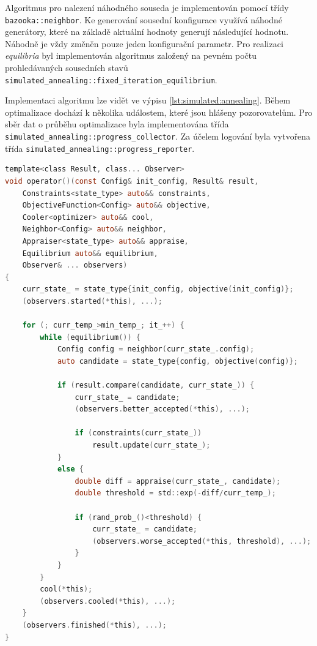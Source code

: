 Algoritmus pro nalezení náhodného souseda je implementován pomocí třídy \texttt{bazooka::neighbor}.
Ke generování sousední konfigurace využívá náhodné generátory, které na základě aktuální hodnoty generují následující hodnotu.
Náhodně je vždy změněn pouze jeden konfigurační parametr.
Pro realizaci \textit{equilibria} byl implementován algoritmus založený na pevném počtu prohledávaných sousedních stavů \texttt{simulated\_annealing::fixed\_iteration\_equilibrium}.

Implementaci algoritmu lze vidět ve výpisu \ref{lst:simulated:annealing}.
Během optimalizace dochází k několika událostem, které jsou hlášeny pozorovatelům.
Pro sběr dat o průběhu optimalizace byla implementována třída \texttt{simulated\_annealing::progress\_collector}.
Za účelem logování byla vytvořena třída \texttt{simulated\_annealing::progress\_reporter}.

\begin{lstlisting}[caption={~Implementace simulovaného ochlazování},label={lst:simulated:annealing},captionpos=t,abovecaptionskip=-\medskipamount,belowcaptionskip=\medskipamount,language=C]
template<class Result, class... Observer>
void operator()(const Config& init_config, Result& result,
    Constraints<state_type> auto&& constraints,
    ObjectiveFunction<Config> auto&& objective,
    Cooler<optimizer> auto&& cool,
    Neighbor<Config> auto&& neighbor,
    Appraiser<state_type> auto&& appraise,
    Equilibrium auto&& equilibrium,
    Observer& ... observers)
{
    curr_state_ = state_type{init_config, objective(init_config)};
    (observers.started(*this), ...);

    for (; curr_temp_>min_temp_; it_++) {
        while (equilibrium()) {
            Config config = neighbor(curr_state_.config);
            auto candidate = state_type{config, objective(config)};

            if (result.compare(candidate, curr_state_)) {
                curr_state_ = candidate;
                (observers.better_accepted(*this), ...);

                if (constraints(curr_state_))
                    result.update(curr_state_);
            }
            else {
                double diff = appraise(curr_state_, candidate);
                double threshold = std::exp(-diff/curr_temp_);

                if (rand_prob_()<threshold) {
                    curr_state_ = candidate;
                    (observers.worse_accepted(*this, threshold), ...);
                }
            }
        }
        cool(*this);
        (observers.cooled(*this), ...);
    }
    (observers.finished(*this), ...);
}
\end{lstlisting}

